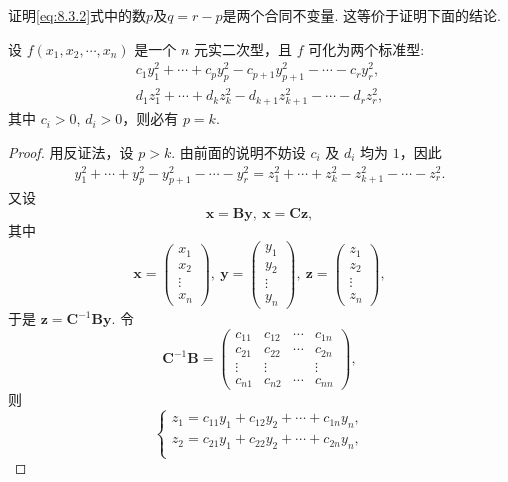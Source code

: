 \documentclass[../../main.tex]{subfiles}
\begin{document}
\begin{theorem}[惯性定理]\label{theorem:惯性定理}
证明\eqref{eq:8.3.2}式中的数$p$及$q=r-p$是两个合同不变量.
这等价于证明下面的结论.

设 $f(x_1,x_2,\cdots,x_n)$ 是一个 $n$ 元实二次型，且 $f$ 可化为两个标准型:
\begin{align*}
c_1y_1^2+\cdots + c_py_p^2 - c_{p + 1}y_{p + 1}^2 - \cdots - c_ry_r^2,\\
d_1z_1^2+\cdots + d_kz_k^2 - d_{k + 1}z_{k + 1}^2 - \cdots - d_rz_r^2,
\end{align*}
其中 $c_i>0$, $d_i>0$，则必有 $p = k$.
\end{theorem}
\begin{proof}
用反证法，设 $p>k$. 由前面的说明不妨设 $c_i$ 及 $d_i$ 均为 $1$，因此
\begin{align}
y_1^2+\cdots + y_p^2 - y_{p + 1}^2 - \cdots - y_r^2 = z_1^2+\cdots + z_k^2 - z_{k + 1}^2 - \cdots - z_r^2.\label{eq:8.3.4}
\end{align}
又设
\[
\boldsymbol{x}=\boldsymbol{B}\boldsymbol{y},\ \boldsymbol{x}=\boldsymbol{C}\boldsymbol{z},
\]
其中
\[
\boldsymbol{x}=\begin{pmatrix}
x_1\\
x_2\\
\vdots\\
x_n
\end{pmatrix},\ \boldsymbol{y}=\begin{pmatrix}
y_1\\
y_2\\
\vdots\\
y_n
\end{pmatrix},\ \boldsymbol{z}=\begin{pmatrix}
z_1\\
z_2\\
\vdots\\
z_n
\end{pmatrix},
\]
于是 $\boldsymbol{z}=\boldsymbol{C}^{-1}\boldsymbol{B}\boldsymbol{y}$. 令
\[
\boldsymbol{C}^{-1}\boldsymbol{B}=\begin{pmatrix}
c_{11} & c_{12} & \cdots & c_{1n}\\
c_{21} & c_{22} & \cdots & c_{2n}\\
\vdots & \vdots & & \vdots\\
c_{n1} & c_{n2} & \cdots & c_{nn}
\end{pmatrix},
\]
则
\[
\begin{cases}
z_1 = c_{11}y_1 + c_{12}y_2 + \cdots + c_{1n}y_n,\\
z_2 = c_{21}y_1 + c_{22}y_2 + \cdots + c_{2n}y_n,\\

\end{cases}\]
\end{proof}
\end{document}
